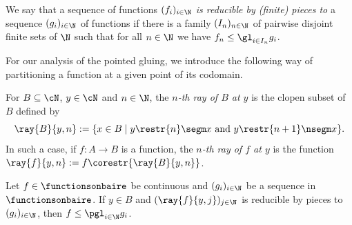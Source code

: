 We say that a sequence of functions $(f_i)_{i\in\N}$ \emph{is reducible by (finite) pieces to} a sequence $(g_i)_{i\in\N}$ of functions
if there is a family $(I_n)_{n\in\N}$ of pairwise disjoint finite sets of $\N$ such that for all $n\in\N$ we have $f_n\leq\gl_{i\in I_n}g_i$.

For our analysis of the pointed gluing, we introduce the following way of partitioning a function at a given point of its codomain.

\begin{definition}
For $B\subseteq \cN$, $y\in \cN$ and $n\in \N$, the \emph{$n$-th ray of $B$ at $y$} is the clopen subset of $B$ defined by 
\[
\ray{B}{y,n}:=\{x\in B\mid y\restr{n}\segm x \text{ and } y\restr{n+1} \nsegm x\}.
\]
In such a case, if $f:A\to B$ is a function, the \emph{$n$-th ray of $f$ at $y$} is the function $\ray{f}{y,n}:=f\corestr{\ray{B}{y,n}}$.
\end{definition}




\begin{proposition}\label{Pgluingasupperbound}
Let $f\in \functionsonbaire$ be continuous %
and $(g_i)_{i\in\N}$ be a sequence in $\functionsonbaire$.
If $y\in B$ and $(\ray{f}{y,j})_{j\in \N}$ is reducible by pieces to $(g_i)_{i\in \N}$,
then $f\leq\pgl_{i\in \N}g_i$.
\end{proposition}

